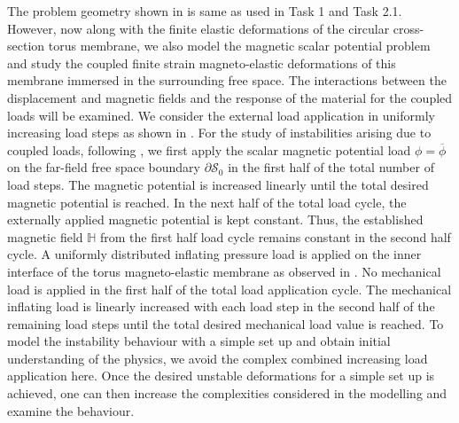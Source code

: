 \documentclass[11pt,a4paper,final]{article}
\begin{document}
The problem geometry shown in  is same as used in Task 1 and Task 2.1. However, now along with the finite elastic deformations of the circular cross-section torus membrane, we also model the magnetic scalar potential problem and study the coupled finite strain magneto-elastic deformations of this membrane immersed in the surrounding free space. The interactions between the displacement and magnetic fields and the response of the material for the coupled loads will be examined. We consider the external load application in uniformly increasing load steps as shown in . For the study of instabilities arising due to coupled loads, following \cite{Reddy2017}, we first apply the scalar magnetic potential load $\phi = \overline{\phi}$ on the far-field free space boundary $\partial \mathcal{S}_0$ in the first half of the total number of load steps. The magnetic potential is increased linearly until the total desired magnetic potential is reached. In the next half of the total load cycle, the externally applied magnetic potential is kept constant. Thus, the established magnetic field $\mathbb{H}$ from the first half load cycle remains constant in the second half cycle. A uniformly distributed inflating pressure load is applied on the inner interface of the torus magneto-elastic membrane as observed in . No mechanical load is applied in the first half of the total load application cycle. The  mechanical inflating load is linearly increased with each load step in the second half of the remaining load steps until the total desired mechanical load value is reached. To model the instability behaviour with a simple set up and obtain initial understanding of the physics, we avoid the complex combined increasing load application here. Once the desired unstable deformations for a simple set up is achieved, one can then increase the complexities considered in the modelling and examine the behaviour. 
\end{document}
